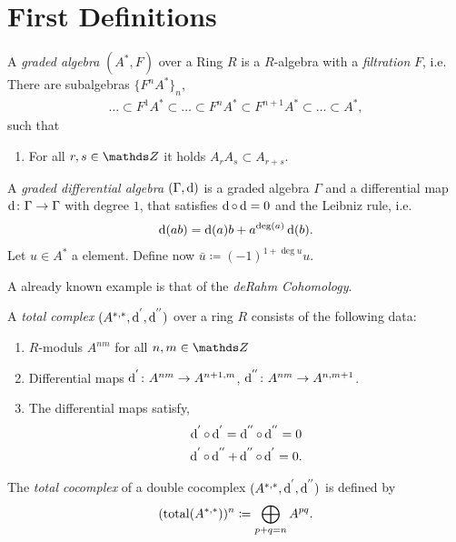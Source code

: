 
\section{First Definitions}

\begin{Def}
	A \textit{graded algebra} $ (A^\ast,F) $ over
	a Ring $ R $ is a $ R $-algebra with a \textit{filtration} $ F $, i.e.
	There are subalgebras $ \{ F^nA^\ast \}_{n} $,
	\begin{gather*}
		 \ldots\subset F^1A^\ast\subset \ldots \subset F^{n}A^\ast \subset F^{n+1}A^\ast 
		\subset \ldots \subset A^\ast,
	\end{gather*}
	such that
	\begin{enumerate}[\textbullet]
		\item For all $ r,s\in \Z $ it holds $ A_rA_s \subset A_{r+s} $.
	\end{enumerate}
	
	
	A \textit{graded differential algebra} $ (\Gamma,\operatorname{d}) $ is a 
	graded algebra $ \Gamma $ and a differential map $ \operatorname{d} \colon \Gamma \rightarrow \Gamma $ with degree $ 1 $, that satisfies $ \operatorname{d}\circ\operatorname{d} =0 $ and the Leibniz rule, i.e.
	\begin{gather*}
		\operatorname{d} (ab) = \operatorname{d} (a) b + a^{\deg(a)} \operatorname{d} (b).
	\end{gather*}
	Let $ u \in A^\ast $ a element. Define now $ \bar{u} \coloneqq (-1)^{1+\deg u} u $.
\end{Def}

\begin{Bsp}
	A already known example is that of the \textit{deRahm Cohomology}.
\end{Bsp}

\begin{Def}
	A \textit{total complex} $ (A^{\ast,\ast},\operatorname{d}^{'},\operatorname{d}^{''}) $ over
	a ring $ R $ consists of the following data:
	\begin{enumerate}[\textbullet]
		\item  $ R $-moduls $ A^{nm} $ for all $ n,m\in\Z $
		\item Differential maps $ \operatorname{d}^{'} \colon A^{nm} \rightarrow A^{n+1,m} $,
		$ \operatorname{d}^{''} \colon A^{nm} \rightarrow A^{n,m+1} $.
		\item The differential maps satisfy, 
		\begin{gather*}
			\operatorname{d}^{'} \circ \operatorname{d}^{'} = \operatorname{d}^{''}\circ\operatorname{d}^{''} = 0\\ \operatorname{d}^{'}\circ\operatorname{d}^{''} + \operatorname{d}^{''}\circ\operatorname{d}^{'} =0 .
		\end{gather*} 
	\end{enumerate}
	
	The \textit{total cocomplex} of a double cocomplex $ (A^{\ast,\ast},\operatorname{d}^{'},\operatorname{d}^{''}) $ is defined by 
	\begin{gather*}
		(\operatorname{total}(A^{\ast,\ast}))^n \coloneqq \bigoplus_{p+q=n} A^{pq}.
	\end{gather*}
\end{Def}




